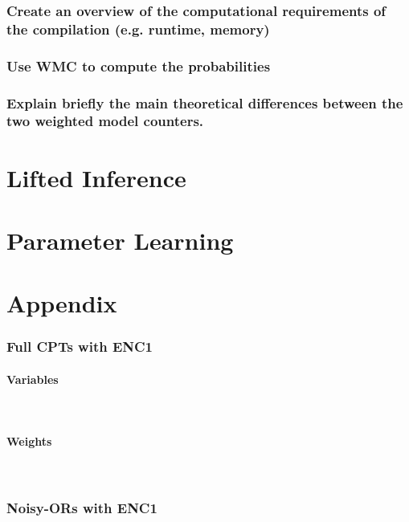 \documentclass{article}
\begin{document}
\subsubsection{Create an overview of the computational requirements of the compilation (e.g. runtime, memory)}

\subsubsection{Use WMC to compute the probabilities }
\subsubsection{Explain briefly the main theoretical differences between the two weighted model counters.}


\section{Lifted Inference}
\section{Parameter Learning}

\newpage




\newpage

\section{Appendix}
\subsubsection*{Full CPTs with ENC1}
\paragraph{Variables}\mbox{}\\

\newpage
\paragraph{Weights}\mbox{}\\


\newpage

\subsubsection*{Noisy-ORs with ENC1}
\end{document}
